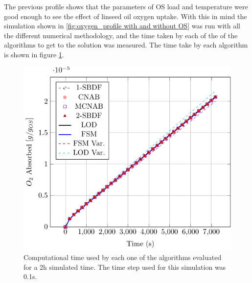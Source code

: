 \begin{refsection}
The previous profile shows that the parameters of OS load and temperature were good enough to see the effect of linseed oil oxygen uptake. With this in mind the simulation shown in \ref{fig:oxygen_profile with and without OS} was run with all the different numerical methodology, and the time taken by each of the of the algorithms to get to the solution was measured. The time take by each algorithm is shown in figure \ref{fig:bar_graph_comp_times}.

\begin{figure}[ht]
    \centering
    \includegraphics[width=0.65\linewidth,page=3]{Documento_Latex/Imagenes/rozogafas.pdf}
    \caption{Computational time used by each one of the algorithms evaluated for a 2h simulated time. The time step used for this simulation was 0.1s.}
    \label{fig:bar_graph_comp_times}
\end{figure}


\end{refsection}
